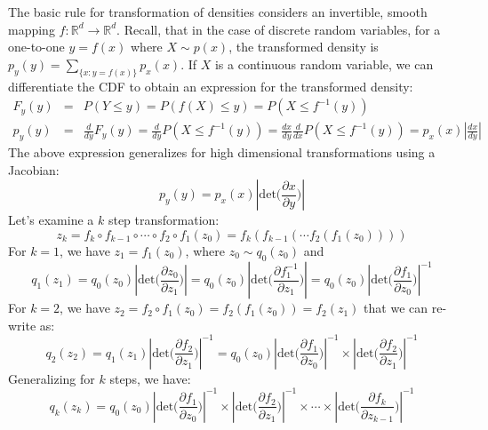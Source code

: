 The basic rule for transformation of densities considers an invertible, smooth mapping $f: \mathbb{R}^{d}\rightarrow \mathbb{R}^{d}$. Recall, that in the case of discrete random variables, for a one-to-one $y=f(x)$ where $X \sim p(x)$, the transformed density is $p_y(y) = \sum_{\{x : y = f(x)\}} p_x(x)$. If $X$ is a continuous random variable, we can differentiate the CDF to obtain an expression for the transformed density:
\begin{eqnarray}
   F_{y}(y) &=& P(Y \leq y) = P(f(X) \leq y) = P(X \leq f^{-1}(y)) \\
   p_{y}(y) &=& \frac{d}{dy}F_{y}(y) = \frac{d}{dy}P(X \leq f^{-1}(y)) = \frac{dx}{dy}\frac{d}{dx}P(X \leq f^{-1}(y)) = p_x(x)|\frac{dx}{dy}|
\end{eqnarray}
The above expression generalizes for high dimensional transformations using a Jacobian:
\begin{equation}
    p_y(y) = p_x(x)|\mathrm{det}\bigg(\frac{\partial x}{\partial y}\bigg)|
\end{equation}
Let's examine a $k$ step transformation:
\begin{equation}
    z_k = f_k \circ f_{k-1} \circ \cdots \circ f_{2} \circ f_{1} (z_0) = f_k(f_{k-1}(\cdots f_{2}(f_{1}(z_0))))
\end{equation}
For $k=1$, we have $z_1 = f_{1}(z_0)$, where $z_0 \sim q_{0}(z_0)$ and
\begin{equation}
   q_{1}(z_1) = q_{0}(z_0)|\mathrm{det}\bigg(\frac{\partial z_0}{\partial z_1}\bigg)|  = q_{0}(z_0)|\mathrm{det}\bigg(\frac{\partial f_{1}^{-1}}{\partial z_1}\bigg)| = q_{0}(z_0)|\mathrm{det}\bigg(\frac{\partial f_{1}}{\partial z_0}\bigg)|^{-1}  
\end{equation}
For $k=2$, we have $z_2 = f_2 \circ f_1 (z_0) = f_2(f_1(z_0)) = f_2(z_1)$ that we can re-write as:
\begin{equation}
    q_{2}(z_2) = q_1(z_1)|\mathrm{det}\bigg(\frac{\partial f_2}{\partial z_1} \bigg)|^{-1} =  q_{0}(z_0)|\mathrm{det}\bigg(\frac{\partial f_{1}}{\partial z_0}\bigg)|^{-1} \times |\mathrm{det}\bigg(\frac{\partial f_2}{\partial z_1} \bigg)|^{-1} 
\end{equation}
Generalizing for $k$ steps, we have:
\begin{equation}
    q_{k}(z_k) = q_{0}(z_0)|\mathrm{det}\bigg(\frac{\partial f_{1}}{\partial z_0}\bigg)|^{-1} \times |\mathrm{det}\bigg(\frac{\partial f_2}{\partial z_1} \bigg)|^{-1} \times \cdots \times |\mathrm{det}\bigg(\frac{\partial f_k}{\partial z_{k-1}}\bigg)|^{-1} 
\end{equation}
